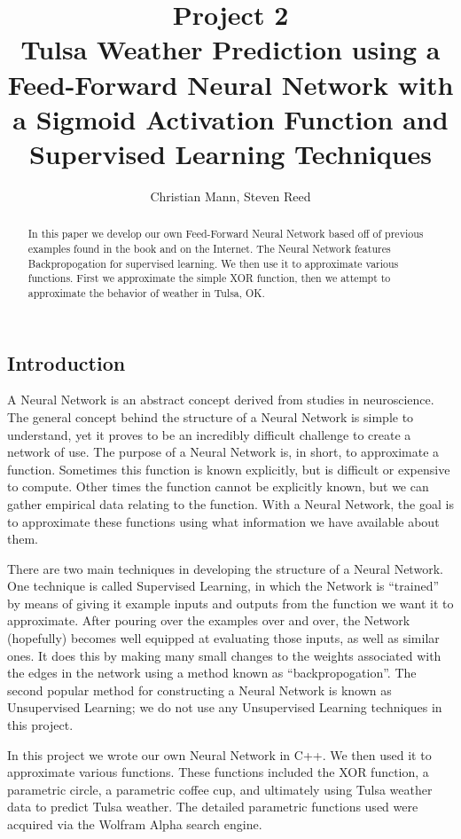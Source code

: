 \documentclass{article}
\title{Project 2\\Tulsa Weather Prediction using a Feed-Forward Neural Network with a Sigmoid Activation Function and Supervised Learning Techniques}
\author{Christian Mann, Steven Reed}
\begin{document}
\maketitle

\begin{multicols}{2}

\begin{abstract}
In this paper we develop our own Feed-Forward Neural Network based off of previous examples found in the book and on the Internet. The Neural Network features Backpropogation for supervised learning. We then use it to approximate various functions. First we approximate the simple XOR function, then we attempt to approximate the behavior of weather in Tulsa, OK.
\end{abstract}

\section{Introduction}

A Neural Network is an abstract concept derived from studies in neuroscience. The general concept behind the structure of a Neural Network is simple to understand, yet it proves to be an incredibly difficult challenge to create a network of use. The purpose of a Neural Network is, in short, to approximate a function. Sometimes this function is known explicitly, but is difficult or expensive to compute. Other times the function cannot be explicitly known, but we can gather empirical data relating to the function. With a Neural Network, the goal is to approximate these functions using what information we have available about them.

There are two main techniques in developing the structure of a Neural Network. One technique is called Supervised Learning, in which the Network is ``trained'' by means of giving it example inputs and outputs from the function we want it to approximate. After pouring over the examples over and over, the Network (hopefully) becomes well equipped at evaluating those inputs, as well as similar ones. It does this by making many small changes to the weights associated with the edges in the network using a method known as ``backpropogation''. The second popular method for constructing a Neural Network is known as Unsupervised Learning; we do not use any Unsupervised Learning techniques in this project.

In this project we wrote our own Neural Network in C++. We then used it to approximate various functions. These functions included the XOR function, a parametric circle, a parametric coffee cup, and ultimately using Tulsa weather data to predict Tulsa weather. The detailed parametric functions used were acquired via the Wolfram Alpha search engine.


\end{multicols}
\end{document}
